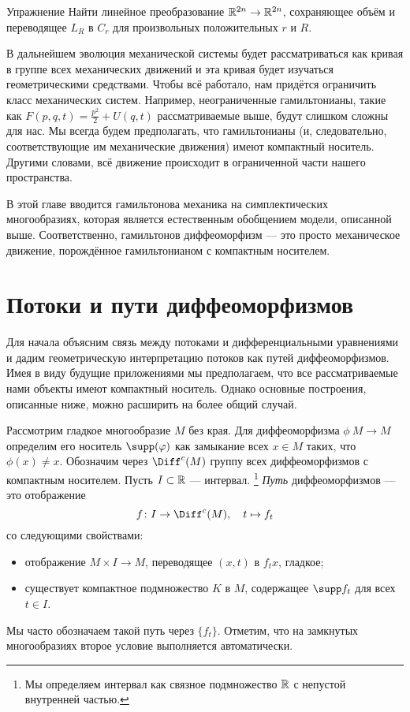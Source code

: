 \begin{thm*}{Упражнение}
Найти линейное преобразование $\mathbb{R}^{2n} \to \mathbb{R}^{2n}$, сохраняющее объём и переводящее $L_R$ в $C_r$ для произвольных положительных $r$ и $R$.
\end{thm*}

В дальнейшем эволюция механической системы будет рассматриваться как кривая в группе всех механических движений и эта кривая будет изучаться геометрическими средствами.
Чтобы всё работало, нам придётся ограничить класс механических систем.
Например, неограниченные гамильтонианы, такие как $F(p,q,t) = \tfrac {p^2}2 + U(q,t)$ рассматриваемые выше, будут слишком сложны для нас.
Мы всегда будем предполагать, что гамильтонианы (и, следовательно, соответствующие им механические движения) имеют компактный носитель.
Другими словами, всё движение происходит в ограниченной части нашего пространства.

В этой главе вводится гамильтонова механика на симплектических многообразиях, которая является естественным обобщением модели, описанной выше.
Соответственно, гамильтонов диффеоморфизм --- это просто механическое движение, порождённое гамильтонианом с компактным носителем. 

\section{Потоки и пути диффеоморфизмов}

Для начала объясним связь между потоками и дифференциальными уравнениями и дадим геометрическую интерпретацию потоков как путей диффеоморфизмов.
Имея в виду будущие приложениями мы предполагаем, что все рассматриваемые нами объекты имеют компактный носитель.
Однако основные построения, описанные ниже, можно расширить на более общий случай.

Рассмотрим гладкое многообразие $M$ без края.
Для диффеоморфизма $\phi\: M \to M$ определим его носитель $\supp (\phi)$ как замыкание всех  $x \in M$ таких, что $\phi(x) \ne x$.
Обозначим через $\Diff^c (M)$ группу всех диффеоморфизмов с компактным носителем.
Пусть $I \subset \mathbb{R}$ --- интервал.%
\footnote{Мы определяем интервал как связное подмножество $\mathbb{R}$ с непустой внутренней частью.}
\emph{Путь} диффеоморфизмов --- это отображение 
\[f\: I \to \Diff^c (M),\quad t \mapsto f_t\]
со следующими свойствами:
\begin{itemize}
\item отображение $M \times I \to M$, переводящее $(x, t)$ в $f_t x$, гладкое;
\item существует компактное подмножество $K$ в $M$, содержащее $\supp f_t$ для всех $t \in I$.
\end{itemize}
Мы часто обозначаем такой путь через $\{f_t\}$.
Отметим, что на замкнутых многообразиях второе условие выполняется автоматически.

